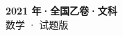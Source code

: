\documentclass[zihao=-4, a4paper]{ctexart}
\begin{document}
\begin{center}
  {\Large\bfseries 2021 年·全国乙卷·文科}\\[4pt]
  {\large 数学 · 试题版}
\end{center}
\medskip
{}

\end{document}
